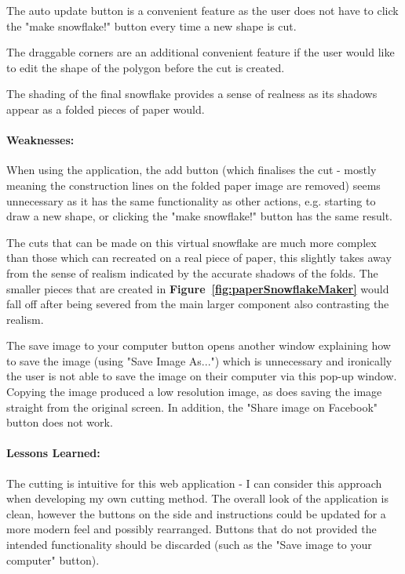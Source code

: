 \documentclass[11pt]{article}
\begin{document}
                The auto update button is a convenient feature as the user does not have to click the "make snowflake!" button every time a new shape is cut. 
                
                The draggable corners are an additional convenient feature if the user would like to edit the shape of the polygon before the cut is created.
                 
                 The shading of the final snowflake provides a sense of realness as its shadows appear as a folded pieces of paper would.
                 
                \paragraph{Weaknesses:}
                When using the application, the add button (which finalises the cut - mostly meaning the construction lines on the folded paper image are removed) seems unnecessary as it has the same functionality as other actions, e.g. starting to draw a new shape, or clicking the "make snowflake!" button has the same result.
                
                The cuts that can be made on this virtual snowflake are much more complex than those which can recreated on a real piece of paper, this slightly takes away from the sense of realism indicated by the accurate shadows of the folds. The smaller pieces that are created in \textbf{Figure~\ref{fig:paperSnowflakeMaker}} would fall off after being severed from the main larger component also contrasting the realism.
                
                The save image to your computer button opens another window explaining how to save the image (using "Save Image As...") which is unnecessary and ironically the user is not able to save the image on their computer via this pop-up window. Copying the image produced a low resolution image, as does saving the image straight from the original screen. In addition, the "Share image on Facebook" button does not work.
            
                \paragraph{Lessons Learned:}
                The cutting is intuitive for this web application - I can consider this approach when developing my own cutting method. The overall look of the application is clean, however the buttons on the side and instructions could be updated for a more modern feel and possibly rearranged. Buttons that do not provided the intended functionality should be discarded (such as the "Save image to your computer" button).
                
\end{document}
